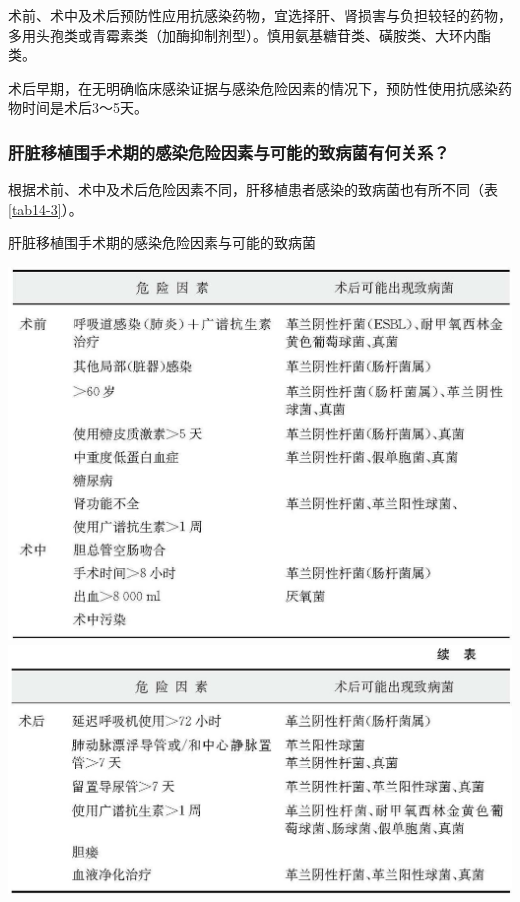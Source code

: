 术前、术中及术后预防性应用抗感染药物，宜选择肝、肾损害与负担较轻的药物，多用头孢类或青霉素类（加酶抑制剂型）。慎用氨基糖苷类、磺胺类、大环内酯类。

术后早期，在无明确临床感染证据与感染危险因素的情况下，预防性使用抗感染药物时间是术后3～5天。

\subsubsection{肝脏移植围手术期的感染危险因素与可能的致病菌有何关系？}

根据术前、术中及术后危险因素不同，肝移植患者感染的致病菌也有所不同（表\ref{tab14-3}）。

\begin{table}[htbp]
\centering
\caption{肝脏移植围手术期的感染危险因素与可能的致病菌}
\label{tab14-3}
\includegraphics[width=\textwidth,height=\textheight,keepaspectratio]{./images/Image00112.jpg}
\includegraphics[width=\textwidth,height=\textheight,keepaspectratio]{./images/Image00113.jpg}
\end{table}

